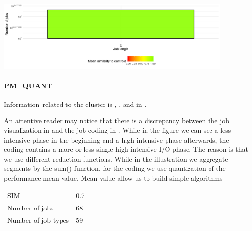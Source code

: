 \documentclass[]{llncs}
\begin{document}
\begingroup
  \centering
  \includegraphics[width=4.61in,height=1.39in]{./media/image2.png}
  \label{fig:use_case:hex_native:length}
\endgroup


\paragraph{PM\_QUANT}
Information\ related to the cluster is , , and in .

An attentive reader may notice that there is a discrepancy between the job visualization in  and the job coding in .
While in the figure we can see a less intensive phase in the beginning and a high intensive phase afterwards, the coding contains a more or less single high intensive I/O phase.
The reason is that we use different reduction functions.
While in the illustration we aggregate segments by the sum() function, for the coding we use quantization of the performance mean value.
Mean value allow us to build simple algorithms

\begingroup
  \centering
  \begin{tabular}{ll}
    SIM                 & 0.7 \\ 
    Number of jobs      & 68  \\ 
    Number of job types & 59  \\ 
  \end{tabular}
  \label{tab:use_case:pm_quant:stats}
\endgroup
\end{document}
